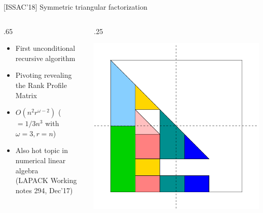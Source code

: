 \documentclass{beamer}
\begin{document}
\begin{frame}
  \begin{block}{[ISSAC'18] Symmetric triangular factorization}
    \begin{columns}
      \begin{column} {.65\textwidth}
        \begin{itemize}
        \item First unconditional recursive algorithm
        \item Pivoting revealing the Rank Profile Matrix
        \item $O(n^2r^{\omega-2}) $ ($=1/3n^3$ with $\omega=3, r=n$)
        \item Also hot topic in numerical linear algebra \\ (LAPACK Working notes 294, Dec'17)
        \end{itemize}
      \end{column}
      \begin{column} {.25\textwidth}
        \begin{center}
          \includegraphics[width=\textwidth]{ARrec11}
        \end{center}
      \end{column}
    \end{columns}
  \end{block}
\end{frame}
\end{document}
